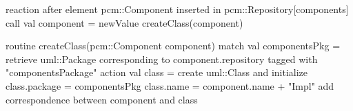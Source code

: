 reaction {
   after element pcm::Component inserted in pcm::Repository[components]
   call {
      val component = newValue
      createClass(component)
   }
}

routine createClass(pcm::Component component) {
   match {
      val componentsPkg = retrieve uml::Package
         corresponding to component.repository
         tagged with "componentsPackage"
   }
   action {
      val class = create uml::Class and initialize {
         class.package = componentsPkg
         class.name = component.name + "Impl"
      }
      add correspondence between component and class
   }
}